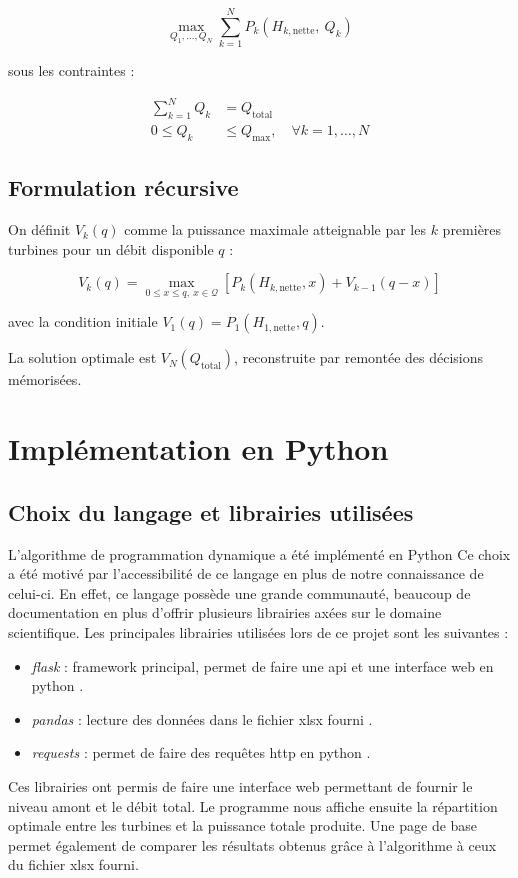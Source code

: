\documentclass[12pt, letterpaper]{report}
\begin{document}
\begin{equation}
    \max_{Q_1, \ldots, Q_N} \sum_{k=1}^{N} P_k\!\left(H_{k,\text{nette}},\ Q_k\right)
    \label{eq:objectif}
\end{equation}

sous les contraintes :

\begin{align}
    \sum_{k=1}^{N} Q_k &= Q_{\text{total}} \label{eq:contrainte_debit} \\
    0 \leq Q_k &\leq Q_{\max}, \quad \forall k = 1, \ldots, N \label{eq:contrainte_borne}
\end{align}

\subsection{Formulation récursive}

On définit $V_k(q)$ comme la puissance maximale atteignable par les $k$ premières turbines pour un débit disponible $q$ :

\begin{equation}
    V_k(q) = \max_{0 \leq x \leq q,\ x \in \mathcal{Q}} \left[ P_k(H_{k,\text{nette}}, x) + V_{k-1}(q - x) \right]
    \label{eq:recursion}
\end{equation}

avec la condition initiale $V_1(q) = P_1(H_{1,\text{nette}}, q)$.

La solution optimale est $V_N(Q_{\text{total}})$, reconstruite par remontée des décisions mémorisées.

\section{Implémentation en Python}

\subsection{Choix du langage et librairies utilisées}
L'algorithme de programmation dynamique a été implémenté en Python Ce choix a été motivé par l'accessibilité de ce langage en plus de notre connaissance de celui-ci.  En effet, ce langage possède une grande communauté, beaucoup de documentation en plus d'offrir plusieurs librairies axées sur le domaine scientifique.  Les principales librairies utilisées lors de ce projet sont les suivantes : 
\begin{itemize}
    \item \textit{flask} : framework principal, permet de faire une api et une interface web en python \cite{flask}.
    \item \textit{pandas} : lecture des données dans le fichier xlsx fourni \cite{pandas}.
    \item \textit{requests} : permet de faire des requêtes http en python \cite{requests}.
\end{itemize}
Ces librairies ont permis de faire une interface web permettant de fournir le niveau amont et le débit total.  Le programme nous affiche ensuite la répartition optimale entre les turbines et la puissance totale produite.  Une page de base permet également de comparer les résultats obtenus grâce à l'algorithme à ceux du fichier xlsx fourni.
\end{document}

